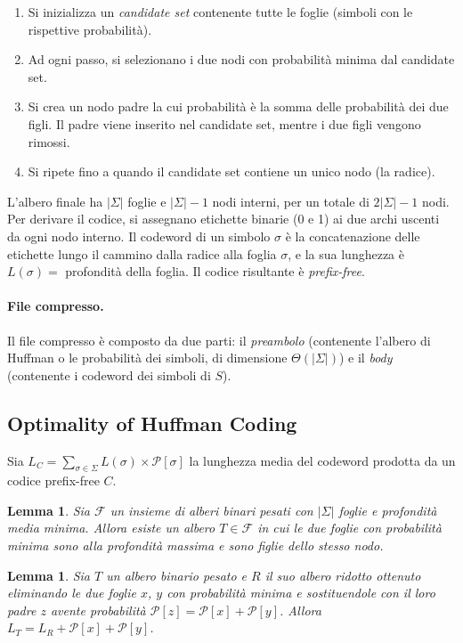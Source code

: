 \documentclass[12pt, a4paper, oneside]{book}
\theoremstyle{plain}
\newtheorem{lemma}[teorema]{Lemma}
\theoremstyle{definition}
\theoremstyle{remark}
\begin{document}
\begin{enumerate}
  \item Si inizializza un \emph{candidate set} contenente tutte le foglie (simboli con le rispettive probabilità).
  \item Ad ogni passo, si selezionano i due nodi con probabilità minima dal candidate set.
  \item Si crea un nodo padre la cui probabilità è la somma delle probabilità dei due figli. Il padre viene inserito nel candidate set, mentre i due figli vengono rimossi.
  \item Si ripete fino a quando il candidate set contiene un unico nodo (la radice).
\end{enumerate}

L'albero finale ha $|\Sigma|$ foglie e $|\Sigma| - 1$ nodi interni, per un totale di $2|\Sigma| - 1$ nodi. Per derivare il codice, si assegnano etichette binarie (0 e 1) ai due archi uscenti da ogni nodo interno. Il codeword di un simbolo $\sigma$ è la concatenazione delle etichette lungo il cammino dalla radice alla foglia $\sigma$, e la sua lunghezza è $L(\sigma) = $ profondità della foglia. Il codice risultante è \emph{prefix-free}.

\paragraph{File compresso.}
Il file compresso è composto da due parti: il \emph{preambolo} (contenente l'albero di Huffman o le probabilità dei simboli, di dimensione $\Theta(|\Sigma|)$) e il \emph{body} (contenente i codeword dei simboli di $S$).

\subsection{Optimality of Huffman Coding}

Sia $L_C = \sum_{\sigma \in \Sigma} L(\sigma) \times \mathcal{P}[\sigma]$ la lunghezza media del codeword prodotta da un codice prefix-free $C$.

\begin{lemma}
\label{lem:huffman-min-depth}
Sia $\mathcal{F}$ un insieme di alberi binari pesati con $|\Sigma|$ foglie e profondità media minima. Allora esiste un albero $T \in \mathcal{F}$ in cui le due foglie con probabilità minima sono alla profondità massima e sono figlie dello stesso nodo.
\end{lemma}

\begin{lemma}
\label{lem:huffman-reduced-tree}
Sia $T$ un albero binario pesato e $R$ il suo albero ridotto ottenuto eliminando le due foglie $x$, $y$ con probabilità minima e sostituendole con il loro padre $z$ avente probabilità $\mathcal{P}[z] = \mathcal{P}[x] + \mathcal{P}[y]$. Allora $L_T = L_R + \mathcal{P}[x] + \mathcal{P}[y]$.
\end{lemma}
\end{document}
